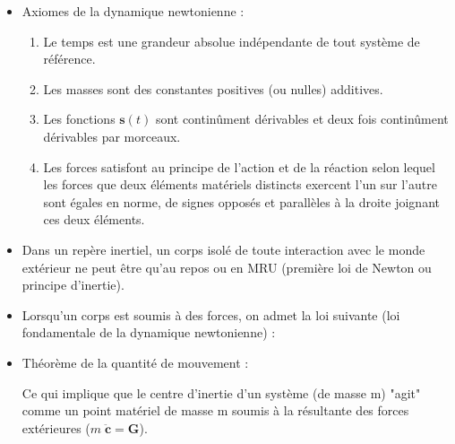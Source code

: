 \documentclass[a4paper]{article}
\begin{document}
\begin{itemize}





\item Axiomes de la dynamique newtonienne : 
\begin{enumerate}
\item Le temps est une grandeur absolue indépendante de tout système de référence.
\item Les masses sont des constantes positives (ou nulles) additives.
\item Les fonctions $ \textbf{s}(t) $ sont continûment dérivables et deux fois continûment dérivables par morceaux.
\item Les forces satisfont au principe de l'action et de la réaction selon lequel les forces que deux éléments matériels distincts exercent l'un sur l'autre sont égales en norme, de signes opposés et parallèles à la droite joignant ces deux éléments.
\end{enumerate}





\item Dans un repère inertiel, un corps isolé de toute interaction avec le monde extérieur ne peut être qu'au repos ou en MRU (première loi de Newton ou principe d'inertie).





\item Lorsqu'un corps est soumis à des forces, on admet la loi suivante (loi fondamentale de la dynamique newtonienne) : 
\begin{center}
\end{center}





\item Théorème de la quantité de mouvement : 
\begin{center}
\end{center}
Ce qui implique que le centre d'inertie d'un système (de masse m) "agit" comme un point matériel de masse m soumis à la résultante des forces extérieures ($ m \; \ddot{\textbf{c}} = \textbf{G} $).






\end{itemize}
\end{document}

